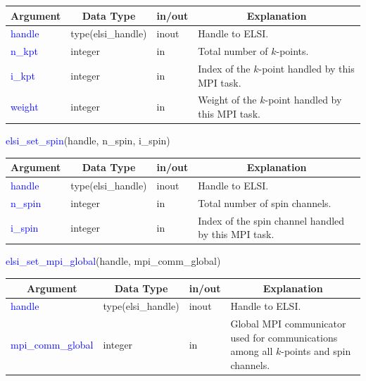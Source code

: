 \documentclass{report}
\newcommand{\tcb}[1]{\textcolor{blue}{#1}}
\begin{document}
\begin{tabular}[]{|p{30mm}|p{30mm}|p{15mm}|p{90mm}|}
\hline
\multicolumn{1}{|c|}{\textbf{Argument}} & \multicolumn{1}{c|}{\textbf{Data Type}} & \multicolumn{1}{c|}{\textbf{in/out}} & \multicolumn{1}{c|}{\textbf{Explanation}}\\
\hline
\tcb{handle} & type(elsi\_handle) & inout & Handle to ELSI.\\
\hline
\tcb{n\_kpt} & integer            & in    & Total number of $k$-points.\\
\hline
\tcb{i\_kpt} & integer            & in    & Index of the $k$-point handled by this MPI task.\\
\hline
\tcb{weight} & integer            & in    & Weight of the $k$-point handled by this MPI task.\\
\hline
\end{tabular}

\newpage
\begin{labeling}{\hspace{6cm}}
\item [\hspace{0.3cm} \tcb{elsi\_set\_spin}(handle, n\_spin, i\_spin)]
\end{labeling}

\begin{tabular}[]{|p{30mm}|p{30mm}|p{15mm}|p{90mm}|}
\hline
\multicolumn{1}{|c|}{\textbf{Argument}} & \multicolumn{1}{c|}{\textbf{Data Type}} & \multicolumn{1}{c|}{\textbf{in/out}} & \multicolumn{1}{c|}{\textbf{Explanation}}\\
\hline
\tcb{handle}  & type(elsi\_handle) & inout & Handle to ELSI.\\
\hline
\tcb{n\_spin} & integer            & in    & Total number of spin channels.\\
\hline
\tcb{i\_spin} & integer            & in    & Index of the spin channel handled by this MPI task.\\
\hline
\end{tabular}

\begin{labeling}{\hspace{6cm}}
\item [\hspace{0.3cm} \tcb{elsi\_set\_mpi\_global}(handle, mpi\_comm\_global)]
\end{labeling}

\begin{tabular}[]{|p{30mm}|p{30mm}|p{15mm}|p{90mm}|}
\hline
\multicolumn{1}{|c|}{\textbf{Argument}} & \multicolumn{1}{c|}{\textbf{Data Type}} & \multicolumn{1}{c|}{\textbf{in/out}} & \multicolumn{1}{c|}{\textbf{Explanation}}\\
\hline
\tcb{handle}            & type(elsi\_handle) & inout & Handle to ELSI.\\
\hline
\tcb{mpi\_comm\_global} & integer            & in    & Global MPI communicator used for communications among all $k$-points and spin channels.\\
\hline
\end{tabular}
\end{document}
